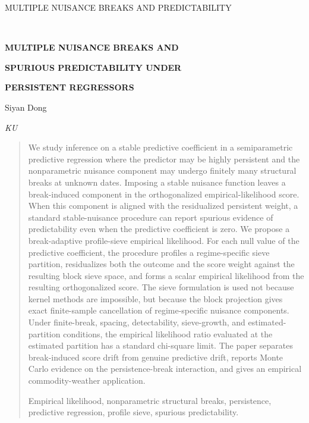 \documentclass[12pt]{article} %
\numberwithin{equation}{section}
\theoremstyle{definition}
\begin{document}
\renewcommand{\baselinestretch}{2}


{\hfill {\footnotesize\rm MULTIPLE NUISANCE BREAKS AND PREDICTABILITY} \hfill}

\renewcommand{\thefootnote}{}
$\ $\par

\fontsize{12}{14pt plus.8pt minus .6pt}\selectfont \vspace{0.8pc}
\centerline{\large\bf MULTIPLE NUISANCE BREAKS AND}
\vspace{2pt}
\centerline{\large\bf SPURIOUS PREDICTABILITY UNDER}
\vspace{2pt}
\centerline{\large\bf PERSISTENT REGRESSORS}
\vspace{.4cm}
\centerline{Siyan Dong}
\vspace{.4cm}
\centerline{\it KU}
\vspace{.55cm} \fontsize{9}{11.5pt plus.8pt minus.6pt}\selectfont

\begin{quotation}
We study inference on a stable predictive coefficient in a semiparametric predictive regression where the predictor may be highly persistent and the nonparametric nuisance component may undergo finitely many structural breaks at unknown dates. Imposing a stable nuisance function leaves a break-induced component in the orthogonalized empirical-likelihood score. When this component is aligned with the residualized persistent weight, a standard stable-nuisance procedure can report spurious evidence of predictability even when the predictive coefficient is zero. We propose a break-adaptive profile-sieve empirical likelihood. For each null value of the predictive coefficient, the procedure profiles a regime-specific sieve partition, residualizes both the outcome and the score weight against the resulting block sieve space, and forms a scalar empirical likelihood from the resulting orthogonalized score. The sieve formulation is used not because kernel methods are impossible, but because the block projection gives exact finite-sample cancellation of regime-specific nuisance components. Under finite-break, spacing, detectability, sieve-growth, and estimated-partition conditions, the empirical likelihood ratio evaluated at the estimated partition has a standard chi-square limit. The paper separates break-induced score drift from genuine predictive drift, reports Monte Carlo evidence on the persistence-break interaction, and gives an empirical commodity-weather application.

\vspace{9pt}
Empirical likelihood, nonparametric structural breaks, persistence, predictive regression, profile sieve, spurious predictability.
\par
\end{quotation}\par
\end{document}
